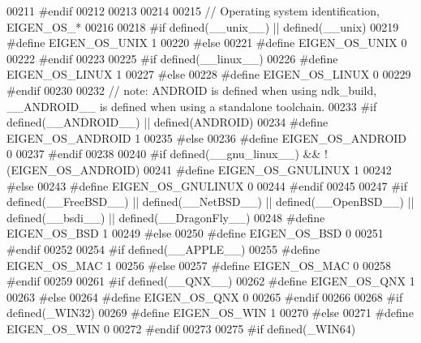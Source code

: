 \begin{DoxyCode}
00211 \textcolor{preprocessor}{#endif}
00212 
00213 
00214 
00215 \textcolor{comment}{// Operating system identification, EIGEN\_OS\_*}
00216 
00218 \textcolor{preprocessor}{#if defined(\_\_unix\_\_) || defined(\_\_unix)}
00219 \textcolor{preprocessor}{  #define EIGEN\_OS\_UNIX 1}
00220 \textcolor{preprocessor}{#else}
00221 \textcolor{preprocessor}{  #define EIGEN\_OS\_UNIX 0}
00222 \textcolor{preprocessor}{#endif}
00223 
00225 \textcolor{preprocessor}{#if defined(\_\_linux\_\_)}
00226 \textcolor{preprocessor}{  #define EIGEN\_OS\_LINUX 1}
00227 \textcolor{preprocessor}{#else}
00228 \textcolor{preprocessor}{  #define EIGEN\_OS\_LINUX 0}
00229 \textcolor{preprocessor}{#endif}
00230 
00232 \textcolor{comment}{// note: ANDROID is defined when using ndk\_build, \_\_ANDROID\_\_ is defined when using a standalone toolchain.}
00233 \textcolor{preprocessor}{#if defined(\_\_ANDROID\_\_) || defined(ANDROID)}
00234 \textcolor{preprocessor}{  #define EIGEN\_OS\_ANDROID 1}
00235 \textcolor{preprocessor}{#else}
00236 \textcolor{preprocessor}{  #define EIGEN\_OS\_ANDROID 0}
00237 \textcolor{preprocessor}{#endif}
00238 
00240 \textcolor{preprocessor}{#if defined(\_\_gnu\_linux\_\_) && !(EIGEN\_OS\_ANDROID)}
00241 \textcolor{preprocessor}{  #define EIGEN\_OS\_GNULINUX 1}
00242 \textcolor{preprocessor}{#else}
00243 \textcolor{preprocessor}{  #define EIGEN\_OS\_GNULINUX 0}
00244 \textcolor{preprocessor}{#endif}
00245 
00247 \textcolor{preprocessor}{#if defined(\_\_FreeBSD\_\_) || defined(\_\_NetBSD\_\_) || defined(\_\_OpenBSD\_\_) || defined(\_\_bsdi\_\_) ||
       defined(\_\_DragonFly\_\_)}
00248 \textcolor{preprocessor}{  #define EIGEN\_OS\_BSD 1}
00249 \textcolor{preprocessor}{#else}
00250 \textcolor{preprocessor}{  #define EIGEN\_OS\_BSD 0}
00251 \textcolor{preprocessor}{#endif}
00252 
00254 \textcolor{preprocessor}{#if defined(\_\_APPLE\_\_)}
00255 \textcolor{preprocessor}{  #define EIGEN\_OS\_MAC 1}
00256 \textcolor{preprocessor}{#else}
00257 \textcolor{preprocessor}{  #define EIGEN\_OS\_MAC 0}
00258 \textcolor{preprocessor}{#endif}
00259 
00261 \textcolor{preprocessor}{#if defined(\_\_QNX\_\_)}
00262 \textcolor{preprocessor}{  #define EIGEN\_OS\_QNX 1}
00263 \textcolor{preprocessor}{#else}
00264 \textcolor{preprocessor}{  #define EIGEN\_OS\_QNX 0}
00265 \textcolor{preprocessor}{#endif}
00266 
00268 \textcolor{preprocessor}{#if defined(\_WIN32)}
00269 \textcolor{preprocessor}{  #define EIGEN\_OS\_WIN 1}
00270 \textcolor{preprocessor}{#else}
00271 \textcolor{preprocessor}{  #define EIGEN\_OS\_WIN 0}
00272 \textcolor{preprocessor}{#endif}
00273 
00275 \textcolor{preprocessor}{#if defined(\_WIN64)}

\end{DoxyCode}

